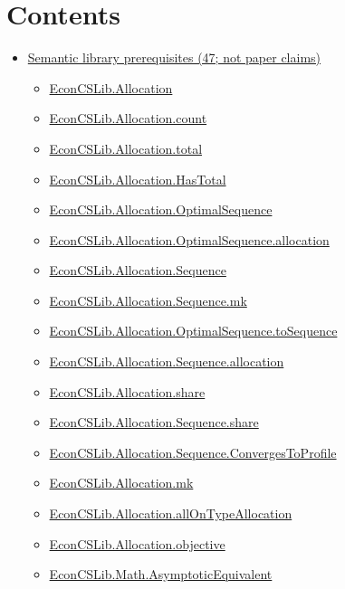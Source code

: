 \documentclass[10pt]{article}
\begin{document}
\section*{Contents}
\begin{itemize}[leftmargin=1.2em]
\item \hyperlink{library-section-817d76f29df3ed36}{Semantic library prerequisites (47; not paper claims)}
\begin{itemize}[leftmargin=1.2em]
\item \hyperlink{library-prerequisite-244a5634666cf50c}{EconCSLib.Allocation}
\item \hyperlink{library-prerequisite-1120c97ff2565677}{EconCSLib.Allocation.count}
\item \hyperlink{library-prerequisite-39475461428c4522}{EconCSLib.Allocation.total}
\item \hyperlink{library-prerequisite-854dbd581a24b11b}{EconCSLib.Allocation.HasTotal}
\item \hyperlink{library-prerequisite-1e33dc126ee38fa0}{EconCSLib.Allocation.OptimalSequence}
\item \hyperlink{library-prerequisite-f057f1f71b64854d}{EconCSLib.Allocation.OptimalSequence.allocation}
\item \hyperlink{library-prerequisite-789aa00e4fe50d99}{EconCSLib.Allocation.Sequence}
\item \hyperlink{library-prerequisite-3322c23d7f6e606c}{EconCSLib.Allocation.Sequence.mk}
\item \hyperlink{library-prerequisite-d5adfaeab2714afc}{EconCSLib.Allocation.OptimalSequence.toSequence}
\item \hyperlink{library-prerequisite-3b25df6be98f16f4}{EconCSLib.Allocation.Sequence.allocation}
\item \hyperlink{library-prerequisite-9ff3b8c891376806}{EconCSLib.Allocation.share}
\item \hyperlink{library-prerequisite-2eb787814a5760ab}{EconCSLib.Allocation.Sequence.share}
\item \hyperlink{library-prerequisite-64f4f097df8be0ff}{EconCSLib.Allocation.Sequence.ConvergesToProfile}
\item \hyperlink{library-prerequisite-1a55187d37c03928}{EconCSLib.Allocation.mk}
\item \hyperlink{library-prerequisite-e62b9706a9918a21}{EconCSLib.Allocation.allOnTypeAllocation}
\item \hyperlink{library-prerequisite-6578aab22e1c5dc9}{EconCSLib.Allocation.objective}
\item \hyperlink{library-prerequisite-cb9d5e5ffda08a9a}{EconCSLib.Math.AsymptoticEquivalent}

\end{itemize}
\end{itemize}
\end{document}
